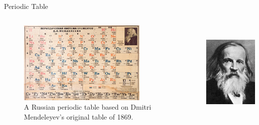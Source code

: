 \documentclass[10pt]{beamer}
\begin{document}
\begin{frame}{Periodic Table}
    \begin{columns}
        \begin{column}{0.6\textwidth}
			\begin{figure}
				\includegraphics[height=4cm]{images/periodic_table.jpg}
				\caption{A Russian periodic table based on Dmitri Mendeleyev's original table of 1869.}
			\end{figure}
        \end{column}
        \begin{column}{0.4\textwidth}  %
                \begin{center}
					\includegraphics[height=5cm]{images/mendeleev.jpg}
                \end{center}
        \end{column}
    \end{columns}
\end{frame}
\end{document}
